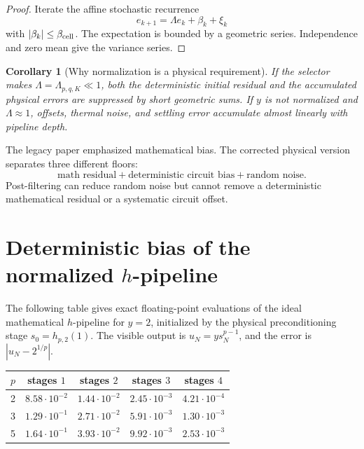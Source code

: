 \documentclass[11pt]{article}
\newtheorem{corollary}[definition]{Corollary}
\begin{document}
\begin{proof}
Iterate the affine stochastic recurrence
\[
        e_{k+1}=\Lambda e_k+\beta_k+\xi_k
\]
with \(|\beta_k|\le\beta_{\rm cell}\).  The expectation is bounded by a
geometric series.  Independence and zero mean give the variance series.
\end{proof}

\begin{corollary}[Why normalization is a physical requirement]
If the selector makes \(\Lambda=\Lambda_{p,q,K}\ll1\), both the deterministic
initial residual and the accumulated physical errors are suppressed by short
geometric sums.  If \(y\) is not normalized and \(\Lambda\approx1\), offsets,
thermal noise, and settling error accumulate almost linearly with pipeline
depth.
\end{corollary}

The legacy paper emphasized mathematical bias.  The corrected physical version
separates three different floors:
\[
        \text{math residual}+\text{deterministic circuit bias}
        +\text{random noise}.
\]
Post-filtering can reduce random noise but cannot remove a deterministic
mathematical residual or a systematic circuit offset.

\section{Deterministic bias of the normalized \(h\)-pipeline}

The following table gives exact floating-point evaluations of the ideal
mathematical \(h\)-pipeline for \(y=2\), initialized by the physical
preconditioning stage \(s_0=h_{p,2}(1)\).  The visible output is
\(u_N=y s_N^{p-1}\), and the error is \(|u_N-2^{1/p}|\).

\begin{center}
\small
\begin{tabular}{@{}ccccc@{}}
\toprule
\(p\) & stages \(1\) & stages \(2\) & stages \(3\) & stages \(4\)\\
\midrule
2 & \(8.58\cdot10^{-2}\) & \(1.44\cdot10^{-2}\) & \(2.45\cdot10^{-3}\) & \(4.21\cdot10^{-4}\)\\
3 & \(1.29\cdot10^{-1}\) & \(2.71\cdot10^{-2}\) & \(5.91\cdot10^{-3}\) & \(1.30\cdot10^{-3}\)\\
5 & \(1.64\cdot10^{-1}\) & \(3.93\cdot10^{-2}\) & \(9.92\cdot10^{-3}\) & \(2.53\cdot10^{-3}\)\\
\bottomrule
\end{tabular}
\end{center}
\end{document}

